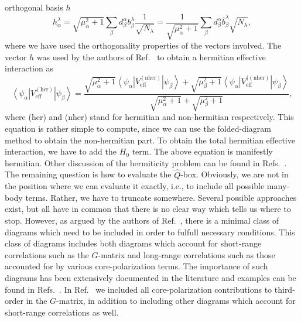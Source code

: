 orthogonal basis $h$
\begin{equation}
  h_{\alpha}^{\lambda}=\sqrt{\mu_{\alpha}^2+1}\sum_{\beta}
  d_{\beta}^{\alpha}b_{\beta}^{\lambda}\frac{1}{\sqrt{N_{\lambda}}}
  =\frac{1}{\sqrt{\mu_{\alpha}^2+1}}\sum_{\beta}
  d_{\beta}^{\alpha}\overline{b}_{\beta}^{\lambda}\sqrt{N_{\lambda}},
  \label{eq:hbasis}
\end{equation}
where we have used the orthogonality properties of the vectors
involved. The vector $h$ was used by the authors of Ref.\ \cite{kehlsok93}
to obtain a hermitian effective interaction as
\begin{equation}
   \left\langle \psi_{\alpha}\right |
   V_{\mathrm{eff}}^{\mathrm{(her)}}\left | \psi_{\beta}\right\rangle=
   \frac{\sqrt{\mu_{\alpha}^2+1}\left\langle \psi_{\alpha} \right |
   V_{\mathrm{eff}}^{\mathrm{(nher)}}\left | \psi_{\beta}\right\rangle
   +\sqrt{\mu_{\beta}^2+1}\left\langle \psi_{\alpha}\right |
   V_{\mathrm{eff}}^{\dagger\mathrm{(nher)}}\left |
   \psi_{\beta} \right\rangle}
   {\sqrt{\mu_{\alpha}^2+1}+\sqrt{\mu_{\beta}^2+1} },
   \label{eq:hermitian}
\end{equation}
where (her) and (nher) stand for hermitian and non-hermitian
respectively. 
This equation is rather simple to compute, since
we can use the folded-diagram method
to obtain the non-hermitian part.
To obtain the total hermitian effective interaction, we have to
add the $H_0$ term. The above equation is manifestly hermitian.
Other discussion of the hermiticity problem can be found
in Refs.\ \cite{lm85,arponen97}.
The remaining question is how to evaluate the $\hat{Q}$-box. 
Obviously, we are not in the position where we can evaluate it
exactly, i.e., to include all possible many-body terms.
Rather, we have to truncate somewhere. 
Several possible approaches exist, but all have in common that
there is no clear way which tells us where to stop.
However, as argued by the authors of Ref.\ \cite{jls82}, there is a
minimal class of diagrams which need to be included 
in order to fulfull necessary conditions. This class
of diagrams includes both diagrams which account for short-range
correlations such as the $G$-matrix and long-range
correlations such as those accounted for by various 
core-polarization terms. 
The importance of such diagrams has been extensively documented
in the literature and examples can be found
in Refs.\ \cite{hko95,eo77}. In Ref.\ \cite{hko95} we included
all core-polarization contributions to third-order
in the $G$-matrix, in addition to including other diagrams
which account for short-range correlations as well. 

